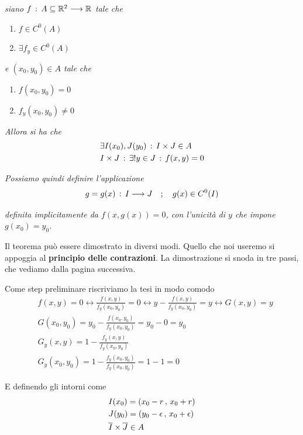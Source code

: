 \textit{siano $f \, : \, A\subseteq \mathbb{R}^{2} \longrightarrow \mathbb{R}^{}$ tale che}
\begin{enumerate}
	\item $f\in C^0(A)$
	\item $\exists f_y\in C^0(A)$
\end{enumerate}

\textit{e $(x_0,y_0)\in A$ tale che}

\begin{enumerate}
	\item $f(x_0,y_0)=0$
	\item $f_y(x_0,y_0)\neq0$
\end{enumerate}

\textit{Allora si ha che}
\begin{align}
	{}&\exists I(x_0),J(y_0) \, : \, I \times J \in A\\ 
	&I \times J\, : \, \exists ! y \in J \, : \, f(x,y)=0
\end{align}

\textit{Possiamo quindi definire l'applicazione}
\begin{align}
	g=g(x) \, : \, I \longrightarrow J \quad ; \quad g(x)\in C^0(I)
\end{align}

\textit{definita implicitamente da $f(x,g(x))=0$, con l'unicità di $y$ che impone $g(x_0)=y_0$.}

\bigskip

Il teorema può essere dimostrato in diversi modi. Quello che noi useremo si appoggia al \textbf{principio delle contrazioni}. La dimostrazione si snoda in tre passi, che vediamo dalla pagina successiva.

Come step preliminare riscriviamo la tesi in modo comodo
\begin{align}
	{}&f(x,y)=0 \leftrightarrow \frac{f(x,y)}{f_y(x_0,y_0)}=0 \leftrightarrow y-\frac{f(x,y)}{f_y(x_0,y_0)}=y\leftrightarrow G(x,y)=y\\
	&G(x_0,y_0)= y_0-\frac{f(x_0,y_0)}{f_y(x_0,y_0)}=y_0 - 0 = y_0\\
	&G_y(x,y)= 1- \frac{f_y(x,y)}{f_y(x_0,y_0)} \\
	&G_y(x_0,y_0)= 1 - \frac{f_y(x_0,y_0)}{f_y(x_0,y_0)} = 1 - 1=0
\end{align}

E definendo gli intorni come
\begin{align}
	{}&I(x_0)= (x_0 - r \, , \, x_0 + r)\\
	&J(y_0)= (y_0 - \epsilon \, , \, x_0 + \epsilon)\\
	&\overline{I} \times \overline{J}\in A
\end{align}

